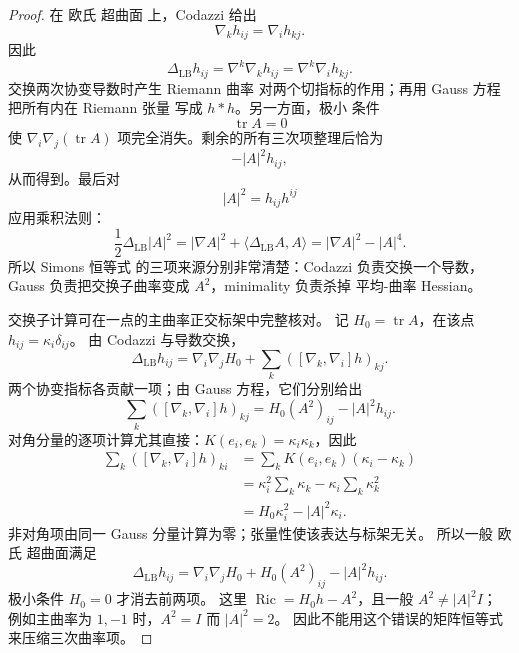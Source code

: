 \begin{proof}
在 欧氏 超曲面 上，Codazzi 给出
\[
\nabla_k h_{ij}=\nabla_i h_{kj}.
\]
因此
\[
\Delta_{\mathrm{LB}}h_{ij}
=\nabla^k\nabla_kh_{ij}
=\nabla^k\nabla_i h_{kj}.
\]
交换两次协变导数时产生 Riemann 曲率 对两个切指标的作用；再用 Gauss 方程把所有内在 Riemann 张量 写成 $h*h$。另一方面，极小 条件
\[
\operatorname{tr}A=0
\]
使 $\nabla_i\nabla_j(\operatorname{tr}A)$ 项完全消失。剩余的所有三次项整理后恰为
\[
-|A|^2h_{ij},
\]
从而得到。最后对
\[
|A|^2=h_{ij}h^{ij}
\]
应用乘积法则：
\[
\frac12\Delta_{\mathrm{LB}}|A|^2
=|\nabla A|^2
+\langle\Delta_{\mathrm{LB}}A,A\rangle
=|\nabla A|^2-|A|^4.
\]
所以 Simons 恒等式 的三项来源分别非常清楚：Codazzi 负责交换一个导数，Gauss 负责把交换子曲率变成 $A^2$，minimality 负责杀掉 平均-曲率 Hessian。

交换子计算可在一点的主曲率正交标架中完整核对。
记 $H_0=\operatorname{tr}A$，在该点 $h_{ij}=\kappa_i\delta_{ij}$。
由 Codazzi 与导数交换，
\[
\Delta_{\mathrm{LB}}h_{ij}
=\nabla_i\nabla_jH_0+
\sum_k([\nabla_k,\nabla_i]h)_{kj}.
\]
两个协变指标各贡献一项；由 Gauss 方程，它们分别给出
\[
\sum_k([\nabla_k,\nabla_i]h)_{kj}
=H_0(A^2)_{ij}-|A|^2h_{ij}.
\]
对角分量的逐项计算尤其直接：$K(e_i,e_k)=\kappa_i\kappa_k$，因此
\[
\begin{aligned}
\sum_k([\nabla_k,\nabla_i]h)_{ki}
&=\sum_kK(e_i,e_k)(\kappa_i-\kappa_k)\\
&=\kappa_i^2\sum_k\kappa_k-\kappa_i\sum_k\kappa_k^2\\
&=H_0\kappa_i^2-|A|^2\kappa_i.
\end{aligned}
\]
非对角项由同一 Gauss 分量计算为零；张量性使该表达与标架无关。
所以一般 欧氏 超曲面满足
\[
\Delta_{\mathrm{LB}}h_{ij}
=\nabla_i\nabla_jH_0+H_0(A^2)_{ij}-|A|^2h_{ij}.
\]
极小条件 $H_0=0$ 才消去前两项。
这里 $\operatorname{Ric}=H_0h-A^2$，且一般 $A^2\ne|A|^2I$；
例如主曲率为 $1,-1$ 时，$A^2=I$ 而 $|A|^2=2$。
因此不能用这个错误的矩阵恒等式来压缩三次曲率项。
\end{proof}
